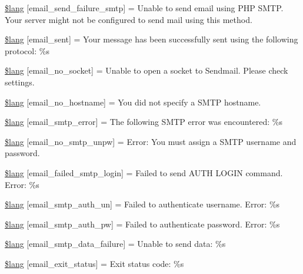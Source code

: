 \begin{DoxyCompactItemize}
\mbox{\hyperlink{email__lang_8php_a88dbb31ae1a6301c98c243040cdd3d31}{\$lang}} \mbox{[}\textquotesingle{}email\+\_\+send\+\_\+failure\+\_\+smtp\textquotesingle{}\mbox{]} = \textquotesingle{}Unable to send email using P\+HP S\+M\+T\+P. Your server might not be configured to send mail using this method.\textquotesingle{}
\item 
\mbox{\hyperlink{email__lang_8php_a5f0a9b6b5508f00c2e5f00ffc97f9de5}{\$lang}} \mbox{[}\textquotesingle{}email\+\_\+sent\textquotesingle{}\mbox{]} = \textquotesingle{}Your message has been successfully sent using the following protocol\+: \%s\textquotesingle{}
\item 
\mbox{\hyperlink{email__lang_8php_afb919754ca7b7a85e2558a0caa0505a0}{\$lang}} \mbox{[}\textquotesingle{}email\+\_\+no\+\_\+socket\textquotesingle{}\mbox{]} = \textquotesingle{}Unable to open a socket to Sendmail. Please check settings.\textquotesingle{}
\item 
\mbox{\hyperlink{email__lang_8php_a4c5e6092925ba771b996c0f982743e36}{\$lang}} \mbox{[}\textquotesingle{}email\+\_\+no\+\_\+hostname\textquotesingle{}\mbox{]} = \textquotesingle{}You did not specify a S\+M\+TP hostname.\textquotesingle{}
\item 
\mbox{\hyperlink{email__lang_8php_a1ba80ca4f0ed85bdeca37fae3db98b97}{\$lang}} \mbox{[}\textquotesingle{}email\+\_\+smtp\+\_\+error\textquotesingle{}\mbox{]} = \textquotesingle{}The following S\+M\+TP error was encountered\+: \%s\textquotesingle{}
\item 
\mbox{\hyperlink{email__lang_8php_a7df98b97e4450b50eece73b2bc0eab33}{\$lang}} \mbox{[}\textquotesingle{}email\+\_\+no\+\_\+smtp\+\_\+unpw\textquotesingle{}\mbox{]} = \textquotesingle{}Error\+: You must assign a S\+M\+TP username and password.\textquotesingle{}
\item 
\mbox{\hyperlink{email__lang_8php_a6d4cd89aad32dd6bb6bb8862524ed11a}{\$lang}} \mbox{[}\textquotesingle{}email\+\_\+failed\+\_\+smtp\+\_\+login\textquotesingle{}\mbox{]} = \textquotesingle{}Failed to send A\+U\+TH L\+O\+G\+IN command. Error\+: \%s\textquotesingle{}
\item 
\mbox{\hyperlink{email__lang_8php_a53ddef97a89f7bd19e8f7c0052dc2ac2}{\$lang}} \mbox{[}\textquotesingle{}email\+\_\+smtp\+\_\+auth\+\_\+un\textquotesingle{}\mbox{]} = \textquotesingle{}Failed to authenticate username. Error\+: \%s\textquotesingle{}
\item 
\mbox{\hyperlink{email__lang_8php_acdda9deb91e5e64499d4c834ea21f992}{\$lang}} \mbox{[}\textquotesingle{}email\+\_\+smtp\+\_\+auth\+\_\+pw\textquotesingle{}\mbox{]} = \textquotesingle{}Failed to authenticate password. Error\+: \%s\textquotesingle{}
\item 
\mbox{\hyperlink{email__lang_8php_a64c334f2c97599411b0e2b7603bdef05}{\$lang}} \mbox{[}\textquotesingle{}email\+\_\+smtp\+\_\+data\+\_\+failure\textquotesingle{}\mbox{]} = \textquotesingle{}Unable to send data\+: \%s\textquotesingle{}
\item 
\mbox{\hyperlink{email__lang_8php_ad76bef5226c25df6e4baf44490983c24}{\$lang}} \mbox{[}\textquotesingle{}email\+\_\+exit\+\_\+status\textquotesingle{}\mbox{]} = \textquotesingle{}Exit status code\+: \%s\textquotesingle{}
\end{DoxyCompactItemize}


